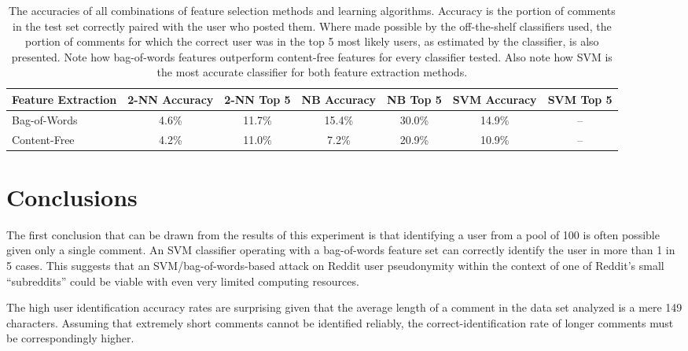 \documentclass{article}
\begin{document}
\begin{table}
\begin{tabular}{l|c c c c c c}
Feature Extraction & 2-NN Accuracy & 2-NN Top 5 & NB Accuracy & NB Top 5 & SVM Accuracy & SVM Top 5 \\
\hline Bag-of-Words & 4.6\% & 11.7\% & 15.4\% & 30.0\% & 14.9\% & -- \\
\hline Content-Free & 4.2\% & 11.0\% & 7.2\% & 20.9\% & 10.9\% & -- \\
\end{tabular}
\caption{\label{tbl:results}
The accuracies of all combinations of feature selection methods and learning algorithms. Accuracy is the portion of comments in the test set correctly paired with the user who posted them. Where made possible by the off-the-shelf classifiers used, the portion of comments for which the correct user was in the top 5 most likely users, as estimated by the classifier, is also presented. Note how bag-of-words features outperform content-free features for every classifier tested. Also note how SVM is the most accurate classifier for both feature extraction methods.
}
\end{table}


\section{Conclusions}

The first conclusion that can be drawn from the results of this experiment is that identifying a user from a pool of 100 is often possible given only a single comment. An SVM classifier operating with a bag-of-words feature set can correctly identify the user in more than 1 in 5 cases. This suggests that an SVM/bag-of-words-based attack on Reddit user pseudonymity within the context of one of Reddit's small ``subreddits'' could be viable with even very limited computing resources.

The high user identification accuracy rates are surprising given that the average length of a comment in the data set analyzed is a mere 149 characters. Assuming that extremely short comments cannot be identified reliably, the correct-identification rate of longer comments must be correspondingly higher.
\end{document}
